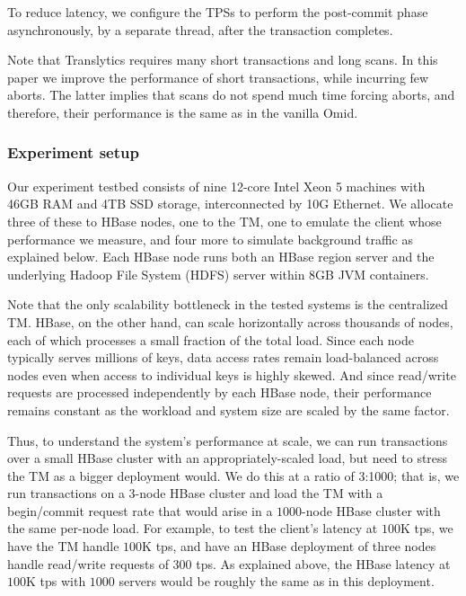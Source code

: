 To reduce latency, we configure the TPSs to perform the post-commit phase asynchronously, 
by a separate thread, after the transaction completes.

Note that Translytics requires many short transactions and long scans. In this paper we improve the performance of short transactions, while incurring few aborts. The latter implies that scans do not spend much time forcing aborts, and therefore, their performance is the same as in the vanilla Omid.

\newpage
\subsubsection{Experiment setup}

Our experiment testbed consists of nine 12-core Intel Xeon 5 machines with 46GB RAM and 4TB 
SSD storage, interconnected by 10G Ethernet. We allocate three of these to HBase nodes, 
one to the TM, one to emulate the client whose performance we measure, and four more to simulate 
background traffic as explained below. Each HBase node runs both an HBase region server and 
the underlying Hadoop File System (HDFS) server within 8GB JVM containers. 

Note that the only scalability bottleneck in the tested systems is the centralized TM.
HBase, on the other hand, can scale horizontally across thousands of nodes, each of which processes a small fraction of the total load. 
Since each node typically serves millions of  keys, data access rates remain load-balanced across nodes 
even when access to individual keys is highly skewed.  And since read/write requests are processed independently by each HBase node, 
their performance remains constant as the workload and  system size are scaled by the same factor. 

Thus, to understand the system's performance at scale, 
we can run transactions over a small HBase cluster with an appropriately-scaled load, 
but need to stress the TM as a bigger deployment would. 
We do this at a ratio of 3:1000; that is, we run transactions on a $3$-node HBase cluster and 
load the TM with a begin/commit request rate that would arise in a $1000$-node HBase cluster with the same per-node load.
For example, to test the client's latency at $100$K tps, we have the TM handle $100$K tps, and have  an HBase deployment of
three nodes handle read/write requests of $300$ tps. As explained above, 
the HBase latency at $100$K tps with $1000$ servers would be roughly the same as in this deployment.

